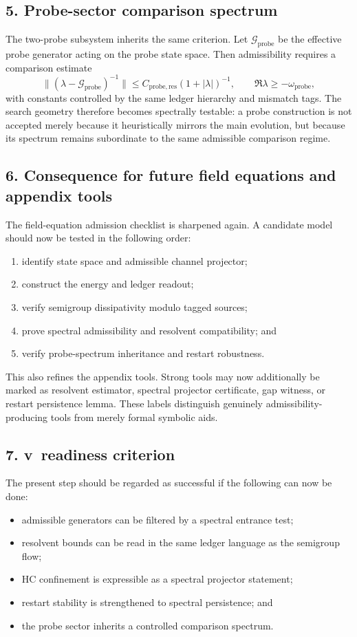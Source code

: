 \subsection*{5. Probe-sector comparison spectrum}
The two-probe subsystem inherits the same criterion. Let
$\mathcal G_{\mathrm{probe}}$ be the effective probe generator acting on the probe
state space. Then admissibility requires a comparison estimate
\[
\| (\lambda-\mathcal G_{\mathrm{probe}})^{-1} \| 
\le C_{\mathrm{probe,res}}(1+|\lambda|)^{-1},
\qquad \Re\lambda\ge -\omega_{\mathrm{probe}},
\]
with constants controlled by the same ledger hierarchy and mismatch tags. The search
geometry therefore becomes spectrally testable: a probe construction is not accepted
merely because it heuristically mirrors the main evolution, but because its spectrum
remains subordinate to the same admissible comparison regime.

\subsection*{6. Consequence for future field equations and appendix tools}
The field-equation admission checklist is sharpened again. A candidate model should
now be tested in the following order:
\begin{enumerate}[label=(\arabic*)]
  \item identify state space and admissible channel projector;
  \item construct the energy and ledger readout;
  \item verify semigroup dissipativity modulo tagged sources;
  \item prove spectral admissibility and resolvent compatibility; and
  \item verify probe-spectrum inheritance and restart robustness.
\end{enumerate}
This also refines the appendix tools. Strong tools may now additionally be marked as
resolvent estimator, spectral projector certificate, gap witness, or restart
persistence lemma. These labels distinguish genuinely admissibility-producing tools
from merely formal symbolic aids.

\subsection*{7. v\docversion\ readiness criterion}
The present step should be regarded as successful if the following can now be done:
\begin{itemize}
  \item admissible generators can be filtered by a spectral entrance test;
  \item resolvent bounds can be read in the same ledger language as the semigroup flow;
  \item HC confinement is expressible as a spectral projector statement;
  \item restart stability is strengthened to spectral persistence; and
  \item the probe sector inherits a controlled comparison spectrum.
\end{itemize}


